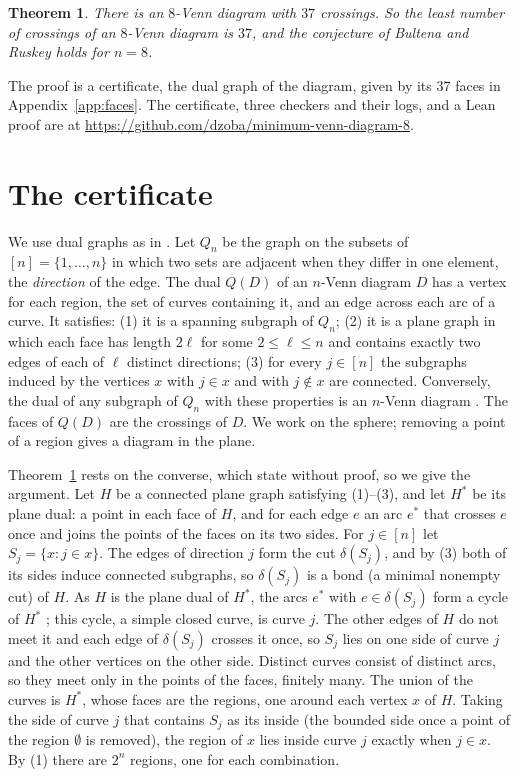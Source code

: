 \documentclass[11pt]{article}
\newtheorem{theorem}{Theorem}
\theoremstyle{remark}
\newcommand{\repo}{\url{https://github.com/dzoba/minimum-venn-diagram-8}}
\begin{document}
\begin{theorem}\label{thm:main}
There is an $8$-Venn diagram with $37$ crossings. So the least number of crossings of an $8$-Venn diagram is $37$,
and the conjecture of Bultena and Ruskey holds for $n=8$.
\end{theorem}

The proof is a certificate, the dual graph of the diagram, given by its 37 faces in Appendix~\ref{app:faces}. The
certificate, three checkers and their logs, and a Lean proof are at \repo.

\section{The certificate}

We use dual graphs as in \cite[Section~1.3]{BGMV}. Let $Q_n$ be the graph on the subsets of $[n]=\{1,\dots,n\}$ in
which two sets are adjacent when they differ in one element, the \emph{direction} of the edge. The dual $Q(D)$ of an
$n$-Venn diagram $D$ has a vertex for each region, the set of curves containing it, and an edge across each arc of a
curve. It satisfies: (1) it is a spanning subgraph of $Q_n$; (2) it is a plane graph in which each face has length
$2\ell$ for some $2\le\ell\le n$ and contains exactly two edges of each of $\ell$ distinct directions; (3) for every
$j\in[n]$ the subgraphs induced by the vertices $x$ with $j\in x$ and with $j\notin x$ are connected. Conversely, the
dual of any subgraph of $Q_n$ with these properties is an $n$-Venn diagram \cite{BGMV}. The faces of $Q(D)$ are the
crossings of $D$. We work on the sphere; removing a point of a region gives a diagram in the plane.

Theorem~\ref{thm:main} rests on the converse, which \cite{BGMV} state without proof, so we give the argument. Let
$H$ be a connected plane graph satisfying (1)--(3), and let $H^*$ be its plane dual: a point in each face of $H$,
and for each edge $e$ an arc $e^*$ that crosses $e$ once and joins the points of the faces on its two sides. For
$j\in[n]$ let $S_j=\{x:j\in x\}$. The edges of direction $j$ form the cut $\delta(S_j)$, and by (3) both of its
sides induce connected subgraphs, so $\delta(S_j)$ is a bond (a minimal nonempty cut) of $H$. As $H$ is the plane
dual of $H^*$, the arcs $e^*$ with $e\in\delta(S_j)$ form a cycle of $H^*$ \cite[Proposition~4.6.1]{Die}; this
cycle, a simple closed curve, is curve $j$. The other edges of $H$ do not meet it and each edge of $\delta(S_j)$
crosses it once, so $S_j$ lies on one side of curve $j$ and the other vertices on the other side. Distinct curves
consist of distinct arcs, so they meet only in the points of the faces, finitely many. The union of the curves is
$H^*$, whose faces are the regions, one around each vertex $x$ of $H$. Taking the side of curve $j$ that contains
$S_j$ as its inside (the bounded side once a point of the region $\emptyset$ is removed), the region of $x$ lies
inside curve $j$ exactly when $j\in x$. By (1) there are $2^n$ regions, one for each combination.
\end{document}
